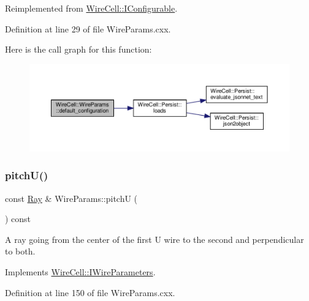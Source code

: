 Reimplemented from \hyperlink{class_wire_cell_1_1_i_configurable_a54841b2da3d1ea02189478bff96f7998}{Wire\+Cell\+::\+I\+Configurable}.



Definition at line 29 of file Wire\+Params.\+cxx.

Here is the call graph for this function\+:
\nopagebreak
\begin{figure}[H]
\begin{center}
\leavevmode
\includegraphics[width=350pt]{class_wire_cell_1_1_wire_params_a062a30e00693380e0cf1d74f463b63b9_cgraph}
\end{center}
\end{figure}
\mbox{\label{class_wire_cell_1_1_wire_params_a8d61eb6c6ef8d3320172840079891322}} 
\subsubsection{\texorpdfstring{pitch\+U()}{pitchU()}}
{\footnotesize\ttfamily const \hyperlink{namespace_wire_cell_a3ab20d9b438feb7eb1ffaab9ba98af0c}{Ray} \& Wire\+Params\+::pitchU (\begin{DoxyParamCaption}{ }\end{DoxyParamCaption}) const\hspace{0.3cm}{\ttfamily [virtual]}}

A ray going from the center of the first U wire to the second and perpendicular to both. 

Implements \hyperlink{class_wire_cell_1_1_i_wire_parameters_a37e3bb80331664feb75d00eb957fda78}{Wire\+Cell\+::\+I\+Wire\+Parameters}.



Definition at line 150 of file Wire\+Params.\+cxx.

\mbox{\label{class_wire_cell_1_1_wire_params_a5bcff5a348b5ad2a26e8e0a6a3c63258}} 
